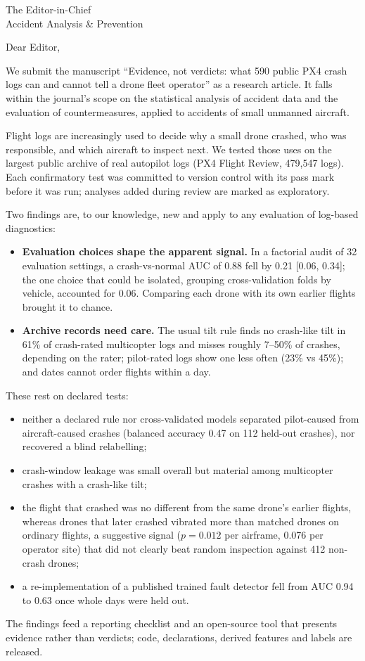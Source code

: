 \documentclass[11pt]{letter}
\begin{document}
\begin{letter}{The Editor-in-Chief\\ Accident Analysis \& Prevention}
\opening{Dear Editor,}
\setlength{\parskip}{0.3em}

We submit the manuscript ``Evidence, not verdicts: what 590 public PX4 crash logs can and cannot tell a drone fleet operator'' as a research article. It falls within the journal's scope on the statistical analysis of accident data and the evaluation of countermeasures,
applied to accidents of small unmanned aircraft.

Flight logs are increasingly used to decide why a small drone crashed, who was responsible, and which aircraft to
inspect next. We tested those uses on the largest public archive of real autopilot logs (PX4 Flight Review, 479,547
logs). Each confirmatory test was committed to version control with its pass mark before it was run;
analyses added during review are marked as exploratory.

Two findings are, to our knowledge, new and apply to any evaluation of log-based diagnostics:
\begin{itemize}
\item \textbf{Evaluation choices shape the apparent signal.} In a factorial audit of 32 evaluation settings, a
crash-vs-normal AUC of 0.88 fell by 0.21 [0.06, 0.34]; the one choice that could be isolated, grouping
cross-validation folds by vehicle, accounted for 0.06. Comparing each drone with its own earlier flights brought it to chance.
\item \textbf{Archive records need care.} The usual tilt rule finds no crash-like tilt in 61\% of crash-rated
multicopter logs and misses roughly 7--50\% of crashes, depending on the rater; pilot-rated logs show one less often (23\% vs
45\%); and dates cannot order flights within a day.
\end{itemize}
These rest on declared tests:
\begin{itemize}
\item neither a declared rule nor cross-validated models separated pilot-caused from aircraft-caused crashes
(balanced accuracy 0.47 on 112 held-out crashes), nor recovered a blind relabelling;
\item crash-window leakage was small overall but material among multicopter crashes with a crash-like tilt;
\item the flight that crashed was no different from the same drone's earlier flights, whereas drones that later
crashed vibrated more than matched drones on ordinary flights, a suggestive signal ($p=0.012$ per airframe,
0.076 per operator site) that did not clearly beat random inspection against 412 non-crash drones;
\item a re-implementation of a published trained fault detector fell from AUC 0.94 to 0.63 once whole
days were held out.
\end{itemize}
The findings feed a reporting checklist and an open-source tool that presents evidence rather than verdicts;
code, declarations, derived features and labels are released.


\end{letter}
\end{document}
